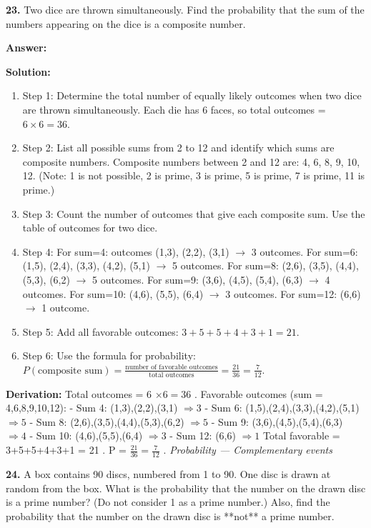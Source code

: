 \documentclass[12pt,a4paper]{exam}
\newcommand{\fitmath}[1]{%
  \sbox{\schmathbox}{$\displaystyle #1$}%
  \ifdim\wd\schmathbox>\linewidth
    \resizebox{\linewidth}{!}{\usebox{\schmathbox}}%
  \else
    \usebox{\schmathbox}%
  \fi}
\begin{document}
\begin{questions}
\question \textbf{23.} Two dice are thrown simultaneously. Find the probability that the sum of the numbers appearing on the dice is a composite number.

\textbf{Answer:}
\begin{center}
\fitmath{\frac{7}{12}}
\end{center}

\textbf{Solution:}
\begin{enumerate}
  \item Step 1: Determine the total number of equally likely outcomes when two dice are thrown simultaneously. Each die has 6 faces, so total outcomes = $6 \times 6 = 36$.
  \item Step 2: List all possible sums from 2 to 12 and identify which sums are composite numbers. Composite numbers between 2 and 12 are: 4, 6, 8, 9, 10, 12. (Note: 1 is not possible, 2 is prime, 3 is prime, 5 is prime, 7 is prime, 11 is prime.)
  \item Step 3: Count the number of outcomes that give each composite sum. Use the table of outcomes for two dice.
  \item Step 4: For sum=4: outcomes (1,3), (2,2), (3,1) $\to$ 3 outcomes. For sum=6: (1,5), (2,4), (3,3), (4,2), (5,1) $\to$ 5 outcomes. For sum=8: (2,6), (3,5), (4,4), (5,3), (6,2) $\to$ 5 outcomes. For sum=9: (3,6), (4,5), (5,4), (6,3) $\to$ 4 outcomes. For sum=10: (4,6), (5,5), (6,4) $\to$ 3 outcomes. For sum=12: (6,6) $\to$ 1 outcome.
  \item Step 5: Add all favorable outcomes: $3+5+5+4+3+1 = 21$.
  \item Step 6: Use the formula for probability: $P(\text{composite sum}) = \frac{\text{number of favorable outcomes}}{\text{total outcomes}} = \frac{21}{36} = \frac{7}{12}$.
\end{enumerate}
\textbf{Derivation:}
Total outcomes =  6 $\times 6 = 36$ .
Favorable outcomes (sum = 4,6,8,9,10,12):
- Sum 4:  (1,3),(2,2),(3,1) $\Rightarrow 3$ 
- Sum 6:  (1,5),(2,4),(3,3),(4,2),(5,1) $\Rightarrow 5$ 
- Sum 8:  (2,6),(3,5),(4,4),(5,3),(6,2) $\Rightarrow 5$ 
- Sum 9:  (3,6),(4,5),(5,4),(6,3) $\Rightarrow 4$ 
- Sum 10:  (4,6),(5,5),(6,4) $\Rightarrow 3$ 
- Sum 12:  (6,6) $\Rightarrow 1$ 
Total favorable =  3+5+5+4+3+1 = 21 .
 P = $\frac{21}{36} = \frac{7}{12}$ .
\hfill \textit{Probability — Complementary events}
\vspace{0.3cm}

\question \textbf{24.} A box contains 90 discs, numbered from 1 to 90. One disc is drawn at random from the box. What is the probability that the number on the drawn disc is a prime number? (Do not consider 1 as a prime number.) Also, find the probability that the number on the drawn disc is **not** a prime number.


\end{questions}
\end{document}
